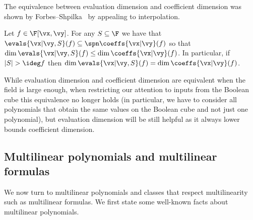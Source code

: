 \documentclass{toc}
\begin{document}
The equivalence between evaluation dimension and coefficient dimension was shown by Forbes--Shpilka~\cite{ForbesShpilka13b} by appealing to interpolation.

\begin{lemmawp}\label{res:evals_eq-coeffs}
   Let $f\in\F[\vx,\vy]$.  For any $S\subseteq\F$ we have that $\evals{\vx|\vy,S}(f)\subseteq\spn \coeffs{\vx|\vy}(f)$ so that $\dim \evals{\vx|\vy,S}(f)\le \dim \coeffs{\vx|\vy}(f)$. In particular, if $|S|>\ideg f$ then $\dim\evals{\vx|\vy,S}(f)=\dim\coeffs{\vx|\vy}(f)$.
\end{lemmawp}

While evaluation dimension and coefficient dimension are equivalent when the field is large enough, when restricting our attention to inputs from the Boolean cube this equivalence no longer holds (in particular, we have to consider all polynomials that obtain the same values on the Boolean cube and not just one polynomial), but evaluation dimension will be still  helpful as it  always lower bounds coefficient dimension.

\subsection{Multilinear polynomials and multilinear formulas}

We now turn to multilinear polynomials and classes that respect multilinearity such as multilinear formulas. We first state some well-known facts about multilinear polynomials.
\end{document}
